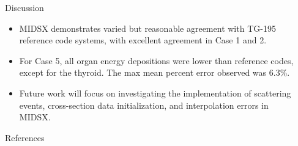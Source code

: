 \documentclass[final]{beamer}
\newlength{\sepwidth}
\newlength{\colwidth}
\newcommand{\separatorcolumn}{\begin{column}{\sepwidth}\end{column}}
\begin{document}
\begin{frame}[t]
\begin{columns}[t]
\begin{column}{\colwidth}
  \begin{block}{Discussion}
  \vspace{-0.4\baselineskip}
  \begin{itemize}[label=\textbullet]
      \item MIDSX demonstrates varied but reasonable agreement with TG-195 reference code systems, with excellent agreement in Case 1 and 2.
      \item For Case 5, all organ energy depositions were lower than reference codes, except for the thyroid. The max mean percent error observed was 6.3\%.
      \item Future work will focus on investigating the implementation of scattering events, cross-section data initialization, and interpolation errors in MIDSX.
  \end{itemize}
    
  \end{block}
  \vspace{-1\baselineskip}
  \begin{block}{References}

    \vspace{-0.5\baselineskip}
    \footnotesize{}

  \end{block}

\end{column}

\separatorcolumn
\end{columns}
\end{frame}
\end{document}

